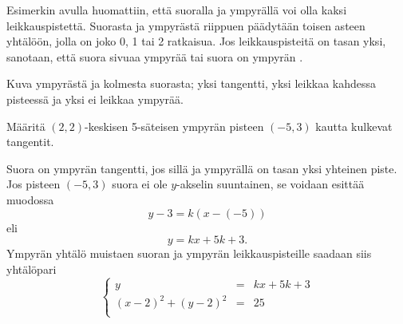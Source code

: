 Esimerkin avulla huomattiin, että suoralla ja ympyrällä voi olla kaksi leikkauspistettä. Suorasta ja ympyrästä riippuen päädytään toisen asteen yhtälöön, jolla on joko 0, 1 tai 2 ratkaisua. Jos leikkauspisteitä on tasan yksi, sanotaan, että suora sivuaa ympyrää tai suora on ympyrän .

Kuva ympyrästä ja kolmesta suorasta; yksi tangentti, yksi leikkaa kahdessa pisteessä ja yksi ei leikkaa ympyrää.


\begin{esimerkki}

Määritä $(2, 2)$-keskisen 5-säteisen ympyrän pisteen $(-5, 3)$ kautta kulkevat tangentit.

\begin{esimratk}
Suora on ympyrän tangentti, jos sillä ja ympyrällä on tasan yksi yhteinen piste. Jos pisteen $(-5, 3)$ suora ei ole $y$-akselin suuntainen, se voidaan esittää muodossa
\[
y-3 = k(x-(-5))
\]
eli
\[
y = kx+5k+3.
\]
Ympyrän yhtälö muistaen suoran ja ympyrän leikkauspisteille saadaan siis yhtälöpari
$$\left\{    
    \begin{array}{rcl}
        y &=&kx+5k+3\\
        (x-2)^2+(y-2)^2 &=& 25 \\
    \end{array}
    \right.$$
    

\end{esimratk}
\end{esimerkki}
